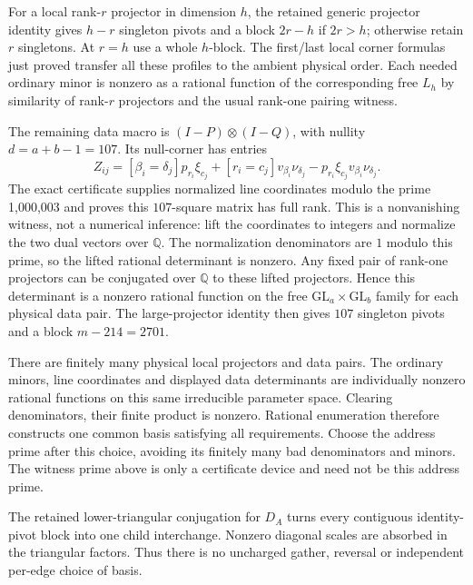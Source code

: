 \documentclass[11pt]{article}
\begin{document}
For a local rank-$r$ projector in dimension $h$, the retained generic
projector identity gives $h-r$ singleton pivots and a block $2r-h$ if
$2r>h$; otherwise retain $r$ singletons. At $r=h$ use a whole $h$-block.
The first/last local corner formulas just proved transfer all these
profiles to the ambient physical order. Each needed ordinary minor is
nonzero as a rational function of the corresponding free $L_h$ by
similarity of rank-$r$ projectors and the usual rank-one pairing witness.

The remaining data macro is $(I-P)\otimes(I-Q)$, with nullity
$d=a+b-1=107$. Its null-corner has entries
\[
 Z_{ij}=[\beta_i=\delta_j]p_{r_i}\xi_{c_j}
       +[r_i=c_j]v_{\beta_i}\nu_{\delta_j}
       -p_{r_i}\xi_{c_j}v_{\beta_i}\nu_{\delta_j}.
\]
The exact certificate supplies normalized line coordinates modulo the
prime 1,000,003 and proves this $107$-square matrix has full rank.
This is a nonvanishing witness, not a numerical inference: lift the
coordinates to integers and normalize the two dual vectors over
$\mathbb Q$. The normalization denominators are $1$ modulo this prime,
so the lifted rational determinant is nonzero. Any fixed pair of rank-one
projectors can be conjugated over $\mathbb Q$ to these lifted projectors.
Hence this determinant is a nonzero rational function on the free
$\mathrm{GL}_a\times\mathrm{GL}_b$ family for each physical data pair.
The large-projector identity then gives $107$ singleton pivots and a
block $m-214=2701$.

There are finitely many physical local projectors and data pairs.
The ordinary minors, line coordinates and displayed data determinants
are individually nonzero rational functions on this same irreducible
parameter space. Clearing denominators, their finite product is nonzero.
Rational enumeration therefore constructs one common basis satisfying all
requirements. Choose the address prime after this choice, avoiding its
finitely many bad denominators and minors. The witness prime above is
only a certificate device and need not be this address prime.

The retained lower-triangular conjugation for $D_A$ turns every contiguous
identity-pivot block into one child interchange. Nonzero diagonal scales
are absorbed in the triangular factors. Thus there is no uncharged
gather, reversal or independent per-edge choice of basis.
\end{document}
